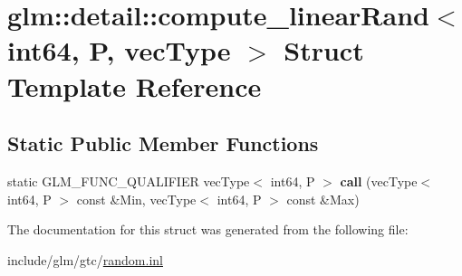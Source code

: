 \hypertarget{structglm_1_1detail_1_1compute__linearRand_3_01int64_00_01P_00_01vecType_01_4}{}\section{glm\+:\+:detail\+:\+:compute\+\_\+linear\+Rand$<$ int64, P, vec\+Type $>$ Struct Template Reference}
\label{structglm_1_1detail_1_1compute__linearRand_3_01int64_00_01P_00_01vecType_01_4}
\subsection*{Static Public Member Functions}
\begin{DoxyCompactItemize}
\item 
\mbox{\label{structglm_1_1detail_1_1compute__linearRand_3_01int64_00_01P_00_01vecType_01_4_ad6b4fdf74a9d37cfe638d062b82536ed}} 
static G\+L\+M\+\_\+\+F\+U\+N\+C\+\_\+\+Q\+U\+A\+L\+I\+F\+I\+ER vec\+Type$<$ int64, P $>$ {\bfseries call} (vec\+Type$<$ int64, P $>$ const \&Min, vec\+Type$<$ int64, P $>$ const \&Max)
\end{DoxyCompactItemize}


The documentation for this struct was generated from the following file\+:\begin{DoxyCompactItemize}
\item 
include/glm/gtc/\hyperlink{random_8inl}{random.\+inl}\end{DoxyCompactItemize}
